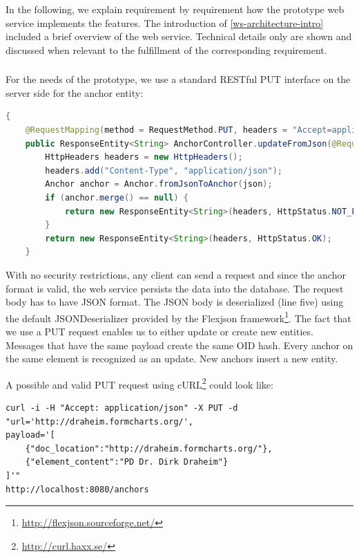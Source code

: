 In the following, we explain requirement by requirement how the prototype web service implements the features. The introduction of \ref{ws-architecture-intro} included a brief overview of the web service. Technical details only are shown and discussed when relevant to the fulfillment of the corresponding requirement.

\subsubsection[Incoming Messages]{\reqWSi}

For the needs of the prototype, we use a standard RESTful PUT interface on the server side for the anchor entity:

\begin{lstlisting}[language=Java]
{
    @RequestMapping(method = RequestMethod.PUT, headers = "Accept=application/json")
    public ResponseEntity<String> AnchorController.updateFromJson(@RequestBody String json) {
        HttpHeaders headers = new HttpHeaders();
        headers.add("Content-Type", "application/json");
        Anchor anchor = Anchor.fromJsonToAnchor(json);
        if (anchor.merge() == null) {
            return new ResponseEntity<String>(headers, HttpStatus.NOT_FOUND);
        }
        return new ResponseEntity<String>(headers, HttpStatus.OK);
    }
\end{lstlisting}

With no security restrictions, any client can send a request and since the anchor format is valid, the web service persists the data into the database. The request body has to have JSON format. The JSON body is deserialized (line five) using the default JSONDeserializer provided by the Flexjson framework\footnote{\url{http://flexjson.sourceforge.net/}}. The fact that we use a PUT request enables us to either update or create new entities. Messages that have the same payload create the same OID hash. Every anchor on the same element is recognized as an update. New anchors insert a new entity. 

A possible and valid PUT request using cURL\footnote{\url{http://curl.haxx.se/}} could look like:

\begin{verbatim}
curl -i -H "Accept: application/json" -X PUT -d 
"url='http://draheim.formcharts.org/', 
payload='[
	{"doc_location":"http://draheim.formcharts.org/"},
	{"element_content":"PD Dr. Dirk Draheim"}
]'"  
http://localhost:8080/anchors
\end{verbatim}

